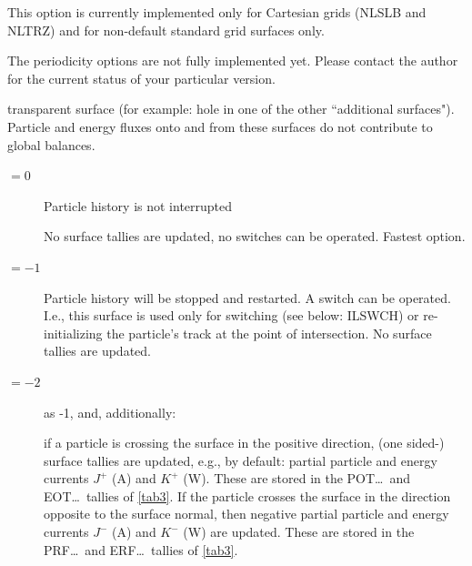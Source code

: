 \begin{description}
\begin{description}
\begin{description}
                        This option is currently implemented only for Cartesian grids (NLSLB and NLTRZ)
                        and for non-default standard grid surfaces only.
                \end{description}
                The periodicity options are not fully implemented yet.
                Please contact the author for the current status of your particular version.
          \item[$\le 0$] transparent surface (for example: hole in one of the other
                ``additional surfaces").
                Particle and energy fluxes onto and from these surfaces do not contribute to
                global balances.
                \begin{description}
                  \item[$= 0$] Particle history is not interrupted 

                        No surface tallies are updated, no switches can be operated.
                        Fastest option.
                  \item[$= -1$] Particle history will be stopped and restarted.
                        A switch can be operated.
                        I.e., this surface is used only for switching (see below: ILSWCH) or
                        re-initializing the particle's track at the point of intersection.
                        No surface tallies are updated.
                  \item[$= -2$] as -1, and, additionally:

                        if a particle is crossing the surface in the positive
                        direction,
                        (one sided-) surface tallies are updated, e.g., by
                        default: partial particle and energy currents $J^+$
                        (\si{\ampere})
                        and $K^+$ (\si{\watt}).
                        These are stored in the POT\dots\ and EOT\dots\ tallies of \cref{tab3}.
                        If the particle crosses the surface in the direction opposite to the surface
                        normal, then negative partial particle and energy currents $J^-$ (\si{\ampere})
                        and $K^-$ (\si{\watt}) are updated.
                        These are stored in the PRF\dots\ and ERF\dots\ tallies of \cref{tab3}.


\end{description}
\end{description}
\end{description}
